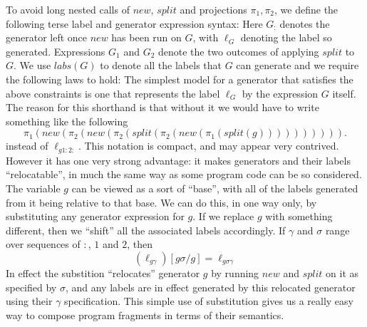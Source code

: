 To avoid long nested calls of $new$, $split$ and projections $\pi_1,\pi_2$,
we define the following terse label and generator expression syntax:
Here $G_{:}$ denotes the generator left once $new$ has been run on $G$,
with $\ell_G$ denoting the label so generated.
Expressions $G_1$ and $G_2$ denote the two outcomes of applying $split$ to $G$.
We use $labs(G)$ to denote all the labels that $G$ can generate
and we require the following laws to hold:
The simplest model for a generator that satisfies the above constraints
is one that represents the label $\ell_G$ by the expression $G$ itself.
The reason for this shorthand is that without it we would have to write
something like the following
\begin{equation*}
\pi_1(new(\pi_2(new(\pi_2(split(\pi_2(new(\pi_1(split(g)))))))))).
\end{equation*}
instead of $\ell_{g1:2:}$.
This notation is compact, and may appear very contrived.
However it has one very strong advantage:
it makes generators and their labels ``relocatable'',
in much the same way as some program code can be so considered.
The variable $g$ can be viewed as a sort of ``base'',
with all of the labels generated from it being relative to that base.
We can do this, in one way only, by substituting any generator expression
for $g$. If we replace $g$ with something different,
then we ``shift'' all the associated labels accordingly.
If $\gamma$ and $\sigma$ range over sequences of $:$, $1$ and $2$, then
\begin{equation}
   (\ell_{g\gamma})[g\sigma/g]  = \ell_{g\sigma\gamma}
\end{equation}
In effect the substition ``relocates'' generator $g$ by running $new$
and $split$ on it as specified by $\sigma$,
and any labels are in effect generated by this relocated generator using
their $\gamma$ specification.
This simple use of substitution gives us a really easy way to compose
program fragments in terms of their semantics.
